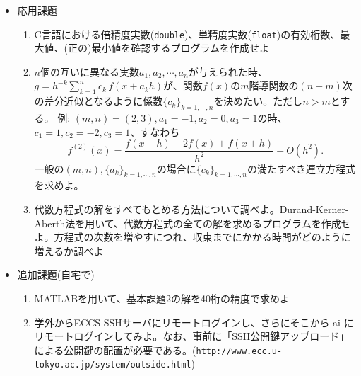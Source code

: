 \documentclass[11pt]{jarticle}
\begin{document}
\begin{itemize}
\item 応用課題
  \begin{enumerate}
  \item C言語における倍精度実数({\tt double})、単精度実数({\tt float})の有効桁数、最大値、(正の)最小値を確認するプログラムを作成せよ
  \item $n$個の互いに異なる実数$a_1,a_2,\cdots,a_n$が与えられた時、$g=h^{-k} \sum_{k=1}^n c_k \, f(x+a_k h)$が、関数$f(x)$の$m$階導関数の$(n-m)$次の差分近似となるように係数$\{ c_k \}_{k=1,\cdots,n}$を決めたい。ただし$n>m$とする。
    例: $(m,n)=(2,3), a_1=-1, a_2=0, a_3=1$の時、$c_1=1, c_2=-2,c_3=1$、すなわち
    \[
    f^{(2)}(x) = \frac{f(x-h)-2f(x)+f(x+h)}{h^2} + O(h^2).
    \]
    一般の$(m,n), \{a_k\}_{k=1,\cdots,n}$の場合に$\{ c_k \}_{k=1,\cdots,n}$の満たすべき連立方程式を求めよ。
  \item 代数方程式の解をすべてもとめる方法について調べよ。Durand-Kerner-Aberth法を用いて、代数方程式の全ての解を求めるプログラムを作成せよ。方程式の次数を増やすにつれ、収束までにかかる時間がどのように増えるか調べよ
  \end{enumerate}  

\item 追加課題(自宅で)
  \begin{enumerate}
  \item MATLABを用いて、基本課題2の解を40桁の精度で求めよ
  \item 学外からECCS SSHサーバにリモートログインし、さらにそこから ai にリモートログインしてみよ。なお、事前に「SSH公開鍵アップロード」による公開鍵の配置が必要である。(\verb+http://www.ecc.u-tokyo.ac.jp/system/outside.html+)
  \end{enumerate}

\end{itemize}
\end{document}
